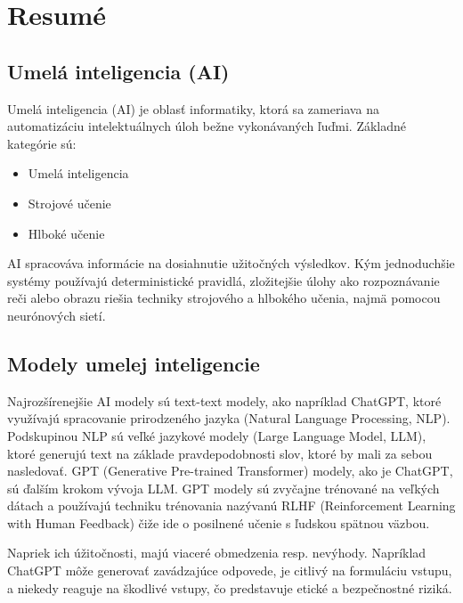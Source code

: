 \chapter{Resumé}


\section*{Umelá inteligencia (AI) \label{sec:AI_resume}}

Umelá inteligencia (AI) je oblasť informatiky, ktorá sa zameriava na automatizáciu intelektuálnych úloh bežne vykonávaných ľuďmi. Základné kategórie sú:

\begin{itemize}
    \item Umelá inteligencia
    \item Strojové učenie
    \item Hlboké učenie
\end{itemize}

AI spracováva informácie na dosiahnutie užitočných výsledkov. Kým jednoduchšie systémy používajú deterministické pravidlá, zložitejšie úlohy ako rozpoznávanie reči alebo obrazu riešia techniky strojového a hlbokého učenia, najmä pomocou neurónových sietí.

\section*{Modely umelej inteligencie \label{sec:AI_models_resume}}

Najrozšírenejšie AI modely sú text-text modely, ako napríklad ChatGPT, ktoré využívajú spracovanie prirodzeného jazyka (Natural Language Processing, NLP). Podskupinou NLP sú veľké jazykové modely (Large Language Model, LLM), ktoré generujú text na základe pravdepodobnosti slov, ktoré by mali za sebou nasledovať. GPT (Generative Pre-trained Transformer) modely, ako je ChatGPT, sú ďalším krokom vývoja LLM. GPT modely sú zvyčajne trénované na veľkých dátach a používajú techniku trénovania nazývanú RLHF (Reinforcement Learning with Human Feedback) čiže ide o posilnené učenie s ľudskou spätnou väzbou.

Napriek ich úžitočnosti, majú viaceré obmedzenia resp. nevýhody. Napríklad ChatGPT môže generovať zavádzajúce odpovede, je citlivý na formuláciu vstupu, a niekedy reaguje na škodlivé vstupy, čo predstavuje etické a bezpečnostné riziká.

